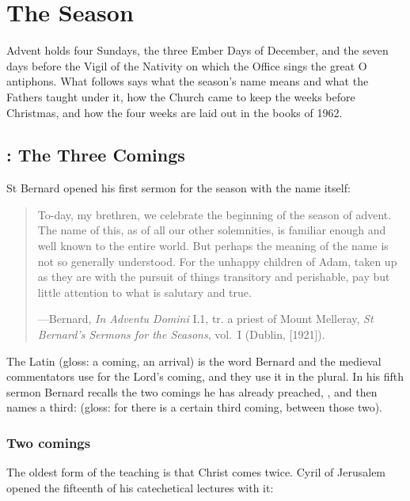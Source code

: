 \section{The Season}

Advent holds four Sundays, the three Ember Days of December, and the seven days before the Vigil
of the Nativity on which the Office sings the great O antiphons. What follows says what the season's name means and what the Fathers taught under it,
how the Church came to keep the weeks before Christmas, and how the four weeks are laid out in
the books of 1962.

\subsection{: The Three Comings}\label{sec:three-comings}

St Bernard opened his first sermon for the season with the name itself:

\begin{quote}
To-day, my brethren, we celebrate the beginning of the season of advent. The name of this, as of
all our other solemnities, is familiar enough and well known to the entire world. But perhaps
the meaning of the name is not so generally understood. For the unhappy children of Adam, taken
up as they are with the pursuit of things transitory and perishable, pay but little attention
to what is salutary and true.\par
{\smallskip\noindent\small ---Bernard, \textit{In Adventu Domini} I.1, tr. a priest of Mount
Melleray, \textit{St Bernard's Sermons for the Seasons}, vol.~I (Dublin, [1921]).\par}
\end{quote}

The Latin  (gloss: a coming, an arrival) is the word Bernard and the medieval
commentators use for the Lord's coming, and they use it in the plural. In his fifth sermon
Bernard recalls the two comings he has already preached, ,
and then names a third:  (gloss: for
there is a certain third coming, between those two).

\subsubsection{Two comings}

The oldest form of the teaching is that Christ comes twice. Cyril of Jerusalem opened the
fifteenth of his catechetical lectures with it:


